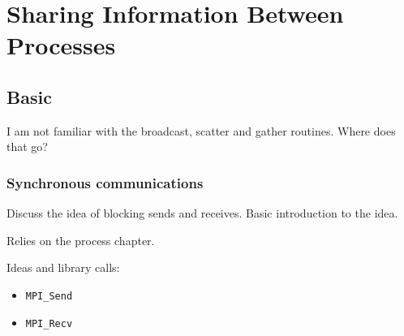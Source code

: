 \chapter{Sharing Information Between Processes}

\section{Basic}

I am not familiar with the broadcast, scatter and gather
routines. Where does that go?

\subsection{Synchronous communications}

Discuss the idea of blocking sends and receives. Basic introduction to
the idea.

Relies on the process chapter.

Ideas and library calls: \\
\begin{itemize}
\item \texttt{MPI\_Send}
\item \texttt{MPI\_Recv}
\end{itemize}

